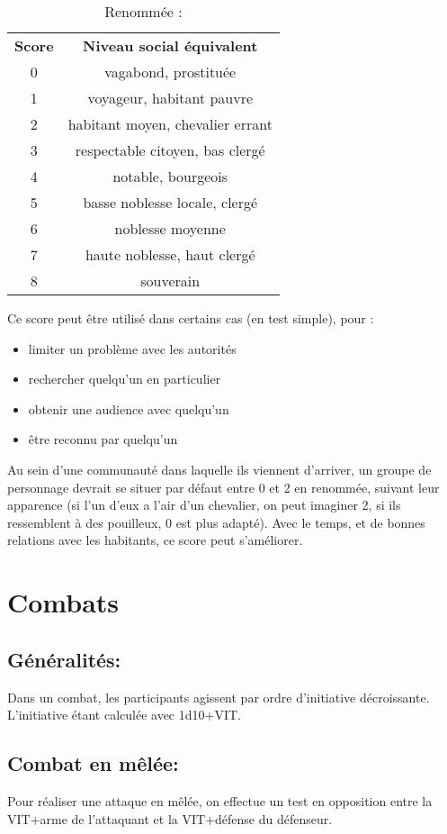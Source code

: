 \documentclass[10pt,a4paper,twocolumn]{book}
\begin{document}
\begin{table}
\caption{ Renommée :}
\label{tableRenommée}
\begin{center}
\begin{tabular}{cc}
\textbf{Score} & \textbf{Niveau social équivalent} \\
   0 & vagabond, prostituée  \\
   1 & voyageur, habitant pauvre  \\
   2 & habitant moyen, chevalier errant \\
   3 & respectable citoyen, bas clergé\\
   4 & notable, bourgeois \\
   5 & basse noblesse locale, clergé \\
   6 & noblesse moyenne \\
   7 & haute noblesse, haut clergé \\
   8 & souverain \\
\end{tabular}
\end{center}
\end{table}
Ce score peut être utilisé dans certains cas (en test simple), pour : 
\begin{itemize}
\item{}limiter un problème avec les autorités
\item{}rechercher quelqu’un en particulier
\item{}obtenir une audience avec quelqu’un
\item{}être reconnu par quelqu’un
\end{itemize}

Au sein d’une communauté dans laquelle ils viennent d’arriver, un groupe de personnage devrait se situer par défaut entre 0 et 2 en renommée, suivant leur apparence (si l’un d’eux a l’air d’un chevalier, on peut imaginer 2, si ils ressemblent à des pouilleux, 0 est plus adapté). Avec le temps, et de bonnes relations avec les habitants, ce score peut s’améliorer.

\chapter{Combats}
\section{Généralités:}
Dans un combat, les participants agissent par ordre d’initiative décroissante. L’initiative étant calculée avec 1d10+VIT.
\section{Combat en mêlée:}
Pour réaliser une attaque en mêlée, on effectue un test en opposition entre la VIT+arme de l’attaquant et la VIT+défense du défenseur.
\end{document}
